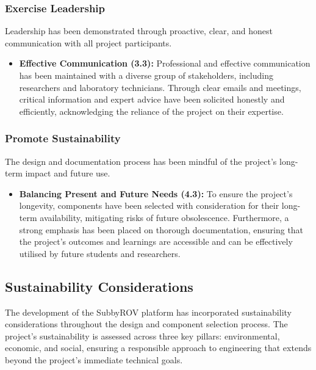 \documentclass[11pt, a4paper]{article}
\begin{document}
\subsubsection{Exercise Leadership}
Leadership has been demonstrated through proactive, clear, and honest communication with all project participants.
\begin{itemize}
    \item \textbf{Effective Communication (3.3):} Professional and effective communication has been maintained with a diverse group of stakeholders, including researchers and laboratory technicians. Through clear emails and meetings, critical information and expert advice have been solicited honestly and efficiently, acknowledging the reliance of the project on their expertise.
\end{itemize}

\subsubsection{Promote Sustainability}
The design and documentation process has been mindful of the project's long-term impact and future use.
\begin{itemize}
    \item \textbf{Balancing Present and Future Needs (4.3):} To ensure the project's longevity, components have been selected with consideration for their long-term availability, mitigating risks of future obsolescence. Furthermore, a strong emphasis has been placed on thorough documentation, ensuring that the project's outcomes and learnings are accessible and can be effectively utilised by future students and researchers.
\end{itemize}

\subsection{Sustainability Considerations}
\label{subsec:sustainability}
The development of the SubbyROV platform has incorporated sustainability considerations throughout the design and component selection process. The project's sustainability is assessed across three key pillars: environmental, economic, and social, ensuring a responsible approach to engineering that extends beyond the project's immediate technical goals.
\end{document}
